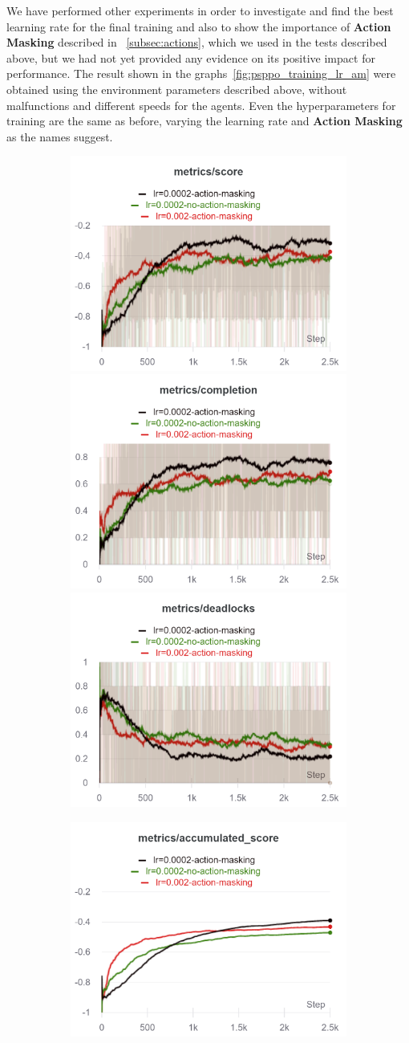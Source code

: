 \documentclass[11pt, a4paper, hidelinks]{report}
\begin{document}
We have performed other experiments in order to investigate and find the best learning rate for the final training and also to show the importance of \textbf{Action Masking} described in ~\ref{subsec:actions}, which we used in the tests described above, but we had not yet provided any evidence on its positive impact for performance. 
The result shown in the graphs~\ref{fig:psppo_training_lr_am} were obtained using the environment parameters described above, without malfunctions and different speeds for the agents.
Even the hyperparameters for training are the same as before, varying the learning rate and \textbf{Action Masking} as the names suggest.
\begin{figure}
	\begin{subfigure}{\linewidth}
		\includegraphics[width=0.33\linewidth]{resources/charts_psppo_3/score}\hfill
		\includegraphics[width=0.33\linewidth]{resources/charts_psppo_3/completion}\hfill
		\includegraphics[width=0.33\linewidth]{resources/charts_psppo_3/deadlocks}
	\end{subfigure}\par\medskip
	\begin{subfigure}{\linewidth}
		\includegraphics[width=0.33\linewidth]{resources/charts_psppo_3/accumulated_score}\hfill

\end{subfigure}
\end{figure}
\end{document}
